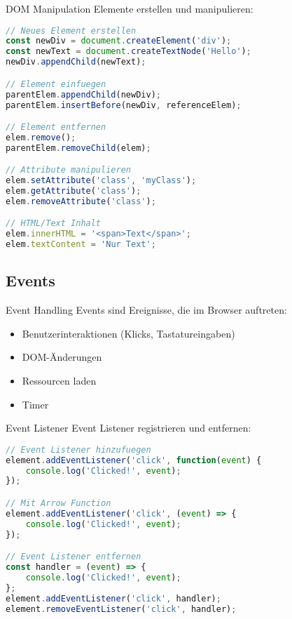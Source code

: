 \begin{KR}{DOM Manipulation}
Elemente erstellen und manipulieren:
\begin{lstlisting}[language=JavaScript, style=basesmol]
// Neues Element erstellen
const newDiv = document.createElement('div');
const newText = document.createTextNode('Hello');
newDiv.appendChild(newText);

// Element einfuegen
parentElem.appendChild(newDiv);
parentElem.insertBefore(newDiv, referenceElem);

// Element entfernen
elem.remove();
parentElem.removeChild(elem);

// Attribute manipulieren
elem.setAttribute('class', 'myClass');
elem.getAttribute('class');
elem.removeAttribute('class');

// HTML/Text Inhalt
elem.innerHTML = '<span>Text</span>';
elem.textContent = 'Nur Text';
\end{lstlisting}
\end{KR}

\subsection{Events}

\begin{concept}{Event Handling}
    Events sind Ereignisse, die im Browser auftreten:
    \begin{itemize}
        \item Benutzerinteraktionen (Klicks, Tastatureingaben)
        \item DOM-Änderungen
        \item Ressourcen laden
        \item Timer
    \end{itemize}
\end{concept}

\begin{KR}{Event Listener}
Event Listener registrieren und entfernen:
\begin{lstlisting}[language=JavaScript, style=basesmol]
// Event Listener hinzufuegen
element.addEventListener('click', function(event) {
    console.log('Clicked!', event);
});

// Mit Arrow Function
element.addEventListener('click', (event) => {
    console.log('Clicked!', event);
});

// Event Listener entfernen
const handler = (event) => {
    console.log('Clicked!', event);
};
element.addEventListener('click', handler);
element.removeEventListener('click', handler);
\end{lstlisting}
\end{KR}

